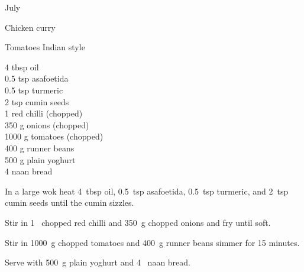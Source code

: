 \begin{menu}{July}
\begin{recipe}{2}{Chicken curry}
\begin{instructions}
    \end{instructions}
    \end{recipe}%
  
    \begin{recipe}{2}{Tomatoes Indian style}%
    
		\begin{ingredients}
		4 tbsp oil  \\
	0.5 tsp asafoetida  \\
	0.5 tsp turmeric  \\
	2 tsp cumin seeds  \\
	1  red chilli (chopped) \\
	350 g onions (chopped) \\
	1000 g tomatoes (chopped) \\
	400 g runner beans  \\
	500 g plain yoghurt  \\
	4  naan bread  \\
	
		\end{ingredients}
	
	
    \begin{instructions}
    \item 
        In a large wok heat
        4~tbsp  oil,
        0.5~tsp  asafoetida,
        0.5~tsp  turmeric,
        and
        2~tsp  cumin seeds
        until
        the cumin sizzles.
      \item 
        Stir in
        1~ chopped red chilli
        and
        350~g chopped onions
        and
        fry until soft.
      \item 
        Stir in
        1000~g chopped tomatoes
        and
        400~g  runner beans
        simmer for 15 minutes.
      \item 
        Serve with
        500~g  plain yoghurt
        and
        4~  naan bread.
      
    \end{instructions}
    \end{recipe}%
  
    \clearpage
    \end{menu}
	
